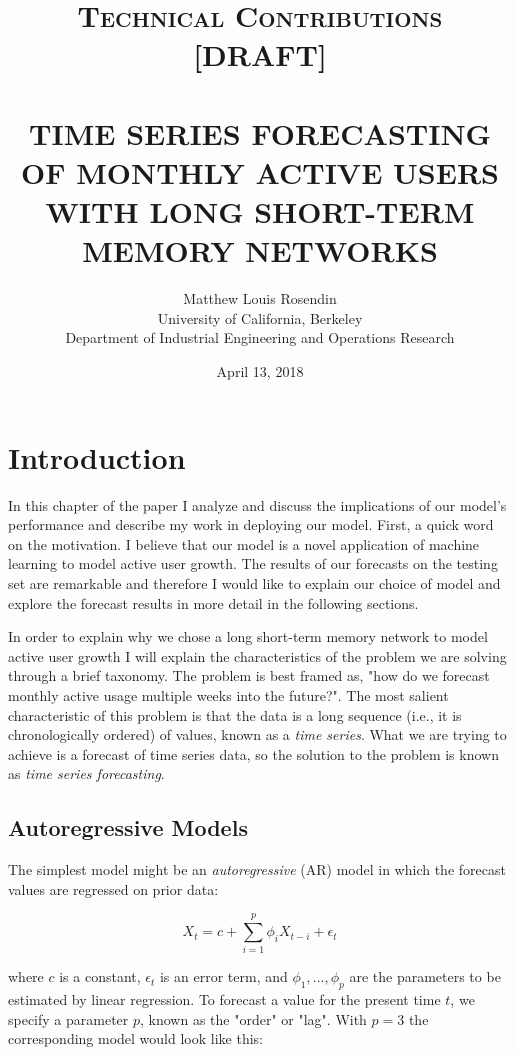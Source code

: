 \documentclass[11pt, oneside]{article}
\title{
  \normalsize \textsc{Technical Contributions [DRAFT]} \\ [2.0cm]
  \HRule{0.5pt} \\
  \LARGE \textbf{\uppercase{
    Time Series Forecasting of Monthly Active Users with Long Short-Term Memory
    Networks
  }}
  \HRule{2pt} \\ [0.5cm]
  \vspace*{5\baselineskip}
}
\author{
  Matthew Louis Rosendin \\
  University of California, Berkeley \\
  Department of Industrial Engineering and Operations Research
}
\date{April 13, 2018}
\begin{document}
\maketitle
\newpage

\tableofcontents
\newpage

\listoffigures
\newpage

\section{Introduction}
In this chapter of the paper I analyze and discuss the implications of our model's performance and describe my work in deploying our model. First, a quick word on the motivation. I believe that our model is a novel application of machine learning to model active user growth. The results of our forecasts on the testing set are remarkable and therefore I would like to explain our choice of model and explore the forecast results in more detail in the following sections.

In order to explain why we chose a long short-term memory network to model active user growth I will explain the characteristics of the problem we are solving through a brief taxonomy. The problem is best framed as, "how do we forecast monthly active usage multiple weeks into the future?". The most salient characteristic of this problem is that the data is a long sequence (i.e., it is chronologically ordered) of values, known as a \textit{time series}. What we are trying to achieve is a forecast of time series data, so the solution to the problem is known as \textit{time series forecasting}.

\subsection{Autoregressive Models}

The simplest model might be an \textit{autoregressive} (AR) model in which the forecast values are regressed on prior data:

\begin{equation}
X_t = c + \sum_{i=1}^p \phi_i X_{t-i} + \epsilon_t
\end{equation}

where $c$ is a constant, $\epsilon_t$ is an error term, and $\phi_1, ..., \phi_p$ are the parameters to be estimated by linear regression. To forecast a value for the present time $t$, we specify a parameter $p$, known as the "order" or "lag". With $p=3$ the corresponding model would look like this:
\end{document}
